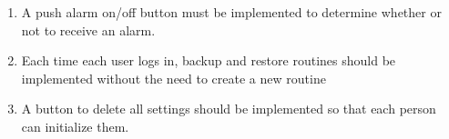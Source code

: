 \begin{enumerate}[label=\arabic*.]
\begin{enumerate}[label*={\arabic*.},ref=\theenumi.\arabic*]
                  \item A push alarm on/off button must be implemented to determine whether or not to receive an alarm.\\

                  \item Each time each user logs in, backup and restore routines should be implemented without the need to create a new routine\\

                  \item A button to delete all settings should be implemented so that each person can initialize them.\\

            \end{enumerate}
\end{enumerate}